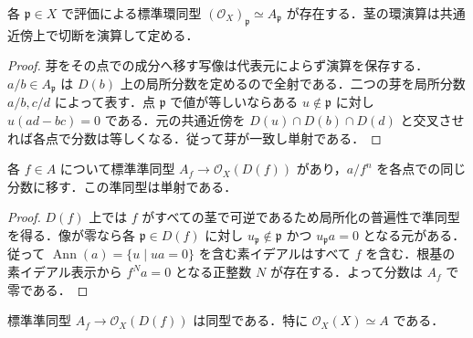 \begin{prop}[構造層の茎]
各 $\mathfrak p\in X$ で評価による標準環同型 $(\mathcal O_X)_{\mathfrak p}\simeq A_{\mathfrak p}$ が存在する．茎の環演算は共通近傍上で切断を演算して定める．
\end{prop}
\begin{proof}
芽をその点での成分へ移す写像は代表元によらず演算を保存する．$a/b\in A_{\mathfrak p}$ は $D(b)$ 上の局所分数を定めるので全射である．二つの芽を局所分数 $a/b,c/d$ によって表す．点 $\mathfrak p$ で値が等しいならある $u\notin\mathfrak p$ に対し $u(ad-bc)=0$ である．元の共通近傍を $D(u)\cap D(b)\cap D(d)$ と交叉させれば各点で分数は等しくなる．従って芽が一致し単射である．
\end{proof}
\begin{prop}[基本開集合への局所化準同型]
各 $f\in A$ について標準準同型 $A_f\to\mathcal O_X(D(f))$ があり，$a/f^n$ を各点での同じ分数に移す．この準同型は単射である．
\end{prop}
\begin{proof}
$D(f)$ 上では $f$ がすべての茎で可逆であるため局所化の普遍性で準同型を得る．像が零なら各 $\mathfrak p\in D(f)$ に対し $u_{\mathfrak p}\notin\mathfrak p$ かつ $u_{\mathfrak p}a=0$ となる元がある．従って $\operatorname{Ann}(a)=\{u\mid ua=0\}$ を含む素イデアルはすべて $f$ を含む．根基の素イデアル表示から $f^N a=0$ となる正整数 $N$ が存在する．よって分数は $A_f$ で零である．
\end{proof}
\begin{prop}[基本開集合の切断環]
標準準同型 $A_f\to\mathcal O_X(D(f))$ は同型である．特に $\mathcal O_X(X)\simeq A$ である．
\end{prop}
